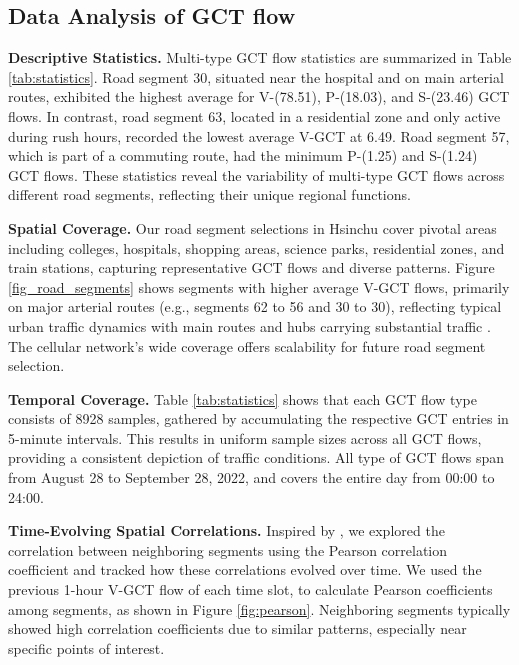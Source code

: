 \documentclass[letterpaper]{article} %
\begin{document}
\subsection{Data Analysis of GCT flow}
\label{Data_Analysis}
\noindent \textbf{Descriptive Statistics.} Multi-type GCT flow statistics are summarized in Table \ref{tab:statistics}. Road segment 30, situated near the hospital and on main arterial routes, exhibited the highest average for V-(78.51), P-(18.03), and S-(23.46) GCT flows. In contrast, road segment 63, located in a residential zone and only active during rush hours, recorded the lowest average V-GCT at 6.49. Road segment 57, which is part of a commuting route, had the minimum P-(1.25) and S-(1.24) GCT flows. These statistics reveal the variability of multi-type GCT flows across different road segments, reflecting their unique regional functions.

\noindent \textbf{Spatial Coverage.} Our road segment selections in Hsinchu cover pivotal areas including colleges, hospitals, shopping areas, science parks, residential zones, and train stations, capturing representative GCT flows and diverse patterns. Figure \ref{fig_road_segments} shows segments with higher average V-GCT flows, primarily on major arterial routes (e.g., segments 62 to 56 and 30 to 30), reflecting typical urban traffic dynamics with main routes and hubs carrying substantial traffic \cite{peng2016computational,babu2020toward}. The cellular network's wide coverage offers scalability for future road segment selection.

\noindent \textbf{Temporal Coverage.} Table \ref{tab:statistics} shows that each GCT flow type consists of 8928 samples, gathered by accumulating the respective GCT entries in 5-minute intervals. This results in uniform sample sizes across all GCT flows, providing a consistent depiction of traffic conditions. All type of GCT flows span from August 28 to September 28, 2022, and covers the entire day from 00:00 to 24:00.

\noindent \textbf{Time-Evolving Spatial Correlations.}
Inspired by \cite{zhang2018citywide,wang2021modeling}, we explored the correlation between neighboring segments using the Pearson correlation coefficient \cite{cohen2009pearson} and tracked how these correlations evolved over time. We used the previous 1-hour V-GCT flow of each time slot, to calculate Pearson coefficients among segments, as shown in Figure \ref{fig:pearson}. Neighboring segments typically showed high correlation coefficients due to similar patterns, especially near specific points of interest.
\end{document}
